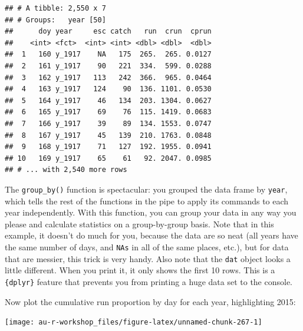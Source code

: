 \documentclass[]{book}
\newenvironment{Shaded}{\begin{snugshade}}{\end{snugshade}}
\newcommand{\KeywordTok}[1]{\textcolor[rgb]{0.13,0.29,0.53}{\textbf{#1}}}
\newcommand{\DataTypeTok}[1]{\textcolor[rgb]{0.13,0.29,0.53}{#1}}
\newcommand{\StringTok}[1]{\textcolor[rgb]{0.31,0.60,0.02}{#1}}
\newcommand{\OperatorTok}[1]{\textcolor[rgb]{0.81,0.36,0.00}{\textbf{#1}}}
\newcommand{\NormalTok}[1]{#1}
\theoremstyle{definition}
\theoremstyle{definition}
\theoremstyle{definition}
\theoremstyle{remark}
\begin{document}
\begin{Shaded}
\end{Shaded}

\begin{verbatim}
## # A tibble: 2,550 x 7
## # Groups:   year [50]
##      doy year     esc catch   run  crun  cprun
##    <int> <fct>  <int> <int> <dbl> <dbl>  <dbl>
##  1   160 y_1917    NA   175  265.  265. 0.0127
##  2   161 y_1917    90   221  334.  599. 0.0288
##  3   162 y_1917   113   242  366.  965. 0.0464
##  4   163 y_1917   124    90  136. 1101. 0.0530
##  5   164 y_1917    46   134  203. 1304. 0.0627
##  6   165 y_1917    69    76  115. 1419. 0.0683
##  7   166 y_1917    39    89  134. 1553. 0.0747
##  8   167 y_1917    45   139  210. 1763. 0.0848
##  9   168 y_1917    71   127  192. 1955. 0.0941
## 10   169 y_1917    65    61   92. 2047. 0.0985
## # ... with 2,540 more rows
\end{verbatim}

The \texttt{group\_by()} function is spectacular: you grouped the data
frame by \texttt{year}, which tells the rest of the functions in the
pipe to apply its commands to each year independently. With this
function, you can group your data in any way you please and calculate
statistics on a group-by-group basis. Note that in this example, it
doesn't do much for you, because the data are so neat (all years have
the same number of days, and \texttt{NAs} in all of the same places,
etc.), but for data that are messier, this trick is very handy. Also
note that the \texttt{dat} object looks a little different. When you
print it, it only shows the first 10 rows. This is a \texttt{\{dplyr\}}
feature that prevents you from printing a huge data set to the console.

Now plot the cumulative run proportion by day for each year,
highlighting 2015:

\begin{center}\texttt{[image: au-r-workshop\_files/figure-latex/unnamed-chunk-267-1]} \end{center}
\end{document}
